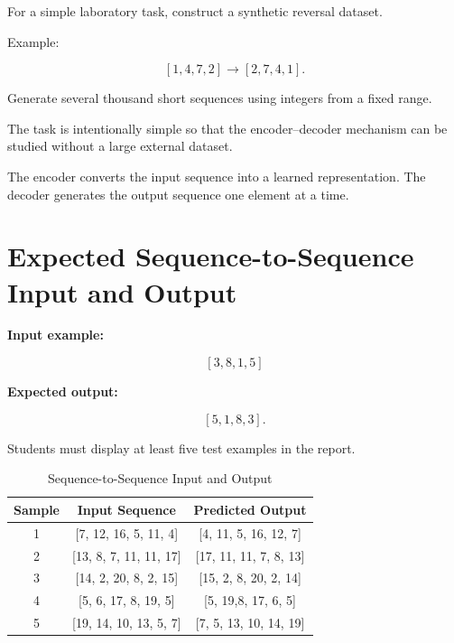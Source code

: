 \documentclass[10pt]{article}
\begin{document}
For a simple laboratory task, construct a synthetic reversal dataset.

Example:

\[
[1,4,7,2]\rightarrow[2,7,4,1].
\]

Generate several thousand short sequences using integers from a fixed range.

The task is intentionally simple so that the encoder--decoder mechanism can
be studied without a large external dataset.

\begin{center}
\end{center}

The encoder converts the input sequence into a learned representation.
The decoder generates the output sequence one element at a time.

\section{Expected Sequence-to-Sequence Input and Output}

\textbf{Input example:}

\[
[3,8,1,5]
\]

\textbf{Expected output:}

\[
[5,1,8,3].
\]

Students must display at least five test examples in the report.

\begin{table}[H]
\centering
\begin{tabular}{|c|c|c|}
\hline
Sample & Input Sequence & Predicted Output\\
\hline
1 & [7, 12, 16, 5, 11, 4] & [4, 11, 5, 16, 12, 7] \\
2 & [13, 8, 7, 11, 11, 17] & [17, 11, 11, 7, 8, 13] \\
3 & [14, 2, 20, 8, 2, 15] & [15, 2, 8, 20, 2, 14] \\
4 & [5, 6, 17, 8, 19, 5] & [5, 19,8, 17, 6, 5] \\
5 & [19, 14, 10, 13, 5, 7] & [7, 5, 13, 10, 14, 19]\\
\hline
\end{tabular}
\caption{Sequence-to-Sequence Input and Output}
\label{tab:seq2seq_samples}
\end{table}
\end{document}
